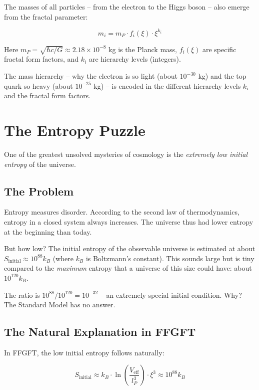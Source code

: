 	The masses of all particles -- from the electron to the Higgs boson -- also emerge from the fractal parameter:
	
	\begin{equation}
		m_i = m_P \cdot f_i(\xi) \cdot \xi^{k_i}
	\end{equation}
	
	Here $m_P = \sqrt{\hbar c/G} \approx 2.18 \times 10^{-8}$ kg is the Planck mass, $f_i(\xi)$ are specific fractal form factors, and $k_i$ are hierarchy levels (integers).
	
	The mass hierarchy -- why the electron is so light (about $10^{-30}$ kg) and the top quark so heavy (about $10^{-25}$ kg) -- is encoded in the different hierarchy levels $k_i$ and the fractal form factors.
	
	\section{The Entropy Puzzle}
	
	One of the greatest unsolved mysteries of cosmology is the \textit{extremely low initial entropy} of the universe.
	
	\subsection{The Problem}
	
	Entropy measures disorder. According to the second law of thermodynamics, entropy in a closed system always increases. The universe thus had lower entropy at the beginning than today.
	
	But how low? The initial entropy of the observable universe is estimated at about $S_{\text{initial}} \approx 10^{88} k_B$ (where $k_B$ is Boltzmann's constant). This sounds large but is tiny compared to the \textit{maximum} entropy that a universe of this size could have: about $10^{120} k_B$.
	
	The ratio is $10^{88}/10^{120} = 10^{-32}$ -- an extremely special initial condition. Why? The Standard Model has no answer.
	
	\subsection{The Natural Explanation in FFGFT}
	
	In FFGFT, the low initial entropy follows naturally:
	
	\begin{equation}
		S_{\text{initial}} \approx k_B \cdot \ln\left(\frac{V_{\text{eff}}}{l_P^3}\right) \cdot \xi^3 \approx 10^{88} k_B
	\end{equation}
	
